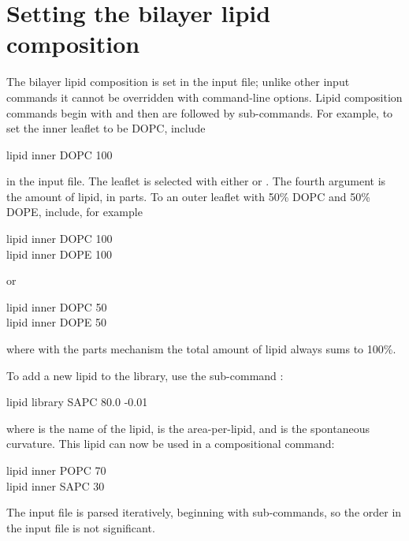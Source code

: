 
\section{ Setting the bilayer lipid composition } \label{sec:lipid_comp}

The bilayer lipid composition is set in the input file; unlike other input commands it cannot be overridden with command-line options.
Lipid composition commands begin with  and then are followed by sub-commands.
For example, to set the inner leaflet to be DOPC, include
\begin{icommand}
lipid inner DOPC 100
\end{icommand}
in the input file.
The leaflet is selected with either  or . 
The fourth argument is the amount of lipid, in parts.
To an outer leaflet with 50\% DOPC and 50\% DOPE, include, for example 
\begin{icommand}
lipid inner DOPC 100 \\
lipid inner DOPE 100
\end{icommand}
or
\begin{icommand}
lipid inner DOPC 50 \\
lipid inner DOPE 50
\end{icommand}
where with the parts mechanism the total amount of lipid always sums to 100\%.

To add a new lipid to the library, use the sub-command :
\begin{icommand}
lipid library SAPC 80.0 -0.01
\end{icommand}
where  is the name of the lipid,  is the area-per-lipid, and  is the spontaneous curvature.
This lipid can now be used in a compositional command:
\begin{icommand}
lipid inner POPC 70 \\
lipid inner SAPC 30
\end{icommand}
The input file is parsed iteratively, beginning with  sub-commands, so the order in the input file is not significant.

%
%
%



